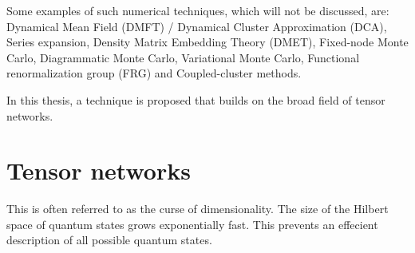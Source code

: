
Some examples of such numerical techniques, which will not be discussed, are: Dynamical Mean Field (DMFT) / Dynamical Cluster Approximation  (DCA), Series expansion, Density Matrix Embedding Theory (DMET), Fixed-node Monte Carlo, Diagrammatic Monte Carlo, Variational Monte Carlo, Functional renormalization group (FRG) and Coupled-cluster methods. \cite{Corboz}

In this thesis, a technique is proposed that builds on the broad field of tensor networks.

\section{Tensor networks}

This is often referred to as the curse of dimensionality. The size of the Hilbert space of quantum states grows exponentially fast. This prevents an effecient description of all possible quantum states. 



